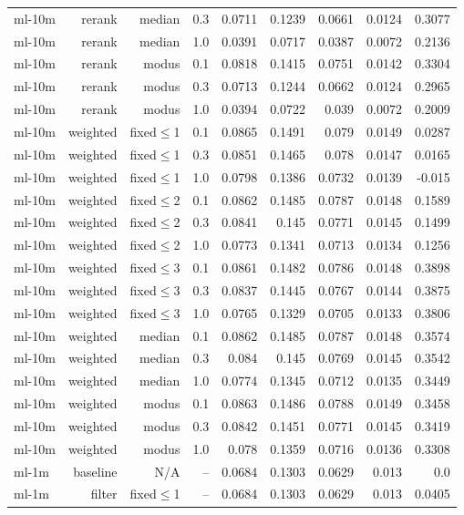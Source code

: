 \begin{longtable}{lrrrrrrrr}
ml-10m & rerank & median & 0.3 & 0.0711 & 0.1239 & 0.0661 & 0.0124 & 0.3077 \\
ml-10m & rerank & median & 1.0 & 0.0391 & 0.0717 & 0.0387 & 0.0072 & 0.2136 \\
ml-10m & rerank & modus & 0.1 & 0.0818 & 0.1415 & 0.0751 & 0.0142 & 0.3304 \\
ml-10m & rerank & modus & 0.3 & 0.0713 & 0.1244 & 0.0662 & 0.0124 & 0.2965 \\
ml-10m & rerank & modus & 1.0 & 0.0394 & 0.0722 & 0.039 & 0.0072 & 0.2009 \\
ml-10m & weighted & fixed$\leq$1 & 0.1 & 0.0865 & 0.1491 & 0.079 & 0.0149 & 0.0287 \\
ml-10m & weighted & fixed$\leq$1 & 0.3 & 0.0851 & 0.1465 & 0.078 & 0.0147 & 0.0165 \\
ml-10m & weighted & fixed$\leq$1 & 1.0 & 0.0798 & 0.1386 & 0.0732 & 0.0139 & -0.015 \\
ml-10m & weighted & fixed$\leq$2 & 0.1 & 0.0862 & 0.1485 & 0.0787 & 0.0148 & 0.1589 \\
ml-10m & weighted & fixed$\leq$2 & 0.3 & 0.0841 & 0.145 & 0.0771 & 0.0145 & 0.1499 \\
ml-10m & weighted & fixed$\leq$2 & 1.0 & 0.0773 & 0.1341 & 0.0713 & 0.0134 & 0.1256 \\
ml-10m & weighted & fixed$\leq$3 & 0.1 & 0.0861 & 0.1482 & 0.0786 & 0.0148 & 0.3898 \\
ml-10m & weighted & fixed$\leq$3 & 0.3 & 0.0837 & 0.1445 & 0.0767 & 0.0144 & 0.3875 \\
ml-10m & weighted & fixed$\leq$3 & 1.0 & 0.0765 & 0.1329 & 0.0705 & 0.0133 & 0.3806 \\
ml-10m & weighted & median & 0.1 & 0.0862 & 0.1485 & 0.0787 & 0.0148 & 0.3574 \\
ml-10m & weighted & median & 0.3 & 0.084 & 0.145 & 0.0769 & 0.0145 & 0.3542 \\
ml-10m & weighted & median & 1.0 & 0.0774 & 0.1345 & 0.0712 & 0.0135 & 0.3449 \\
ml-10m & weighted & modus & 0.1 & 0.0863 & 0.1486 & 0.0788 & 0.0149 & 0.3458 \\
ml-10m & weighted & modus & 0.3 & 0.0842 & 0.1451 & 0.0771 & 0.0145 & 0.3419 \\
ml-10m & weighted & modus & 1.0 & 0.078 & 0.1359 & 0.0716 & 0.0136 & 0.3308 \\
ml-1m & baseline & N/A & -- & 0.0684 & 0.1303 & 0.0629 & 0.013 & 0.0 \\
ml-1m & filter & fixed$\leq$1 & -- & 0.0684 & 0.1303 & 0.0629 & 0.013 & 0.0405 \\

\end{longtable}

